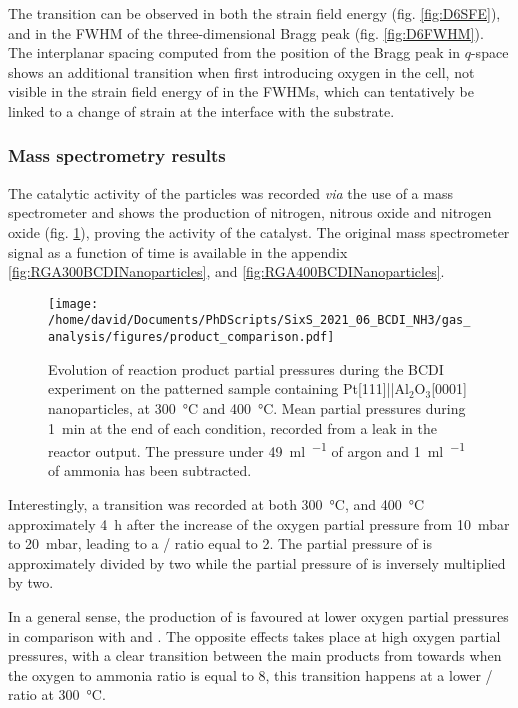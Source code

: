 The transition can be observed in both the strain field energy (fig. \ref{fig:D6SFE}), and in the FWHM of the three-dimensional Bragg peak (fig. \ref{fig:D6FWHM}).
The interplanar spacing computed from the position of the Bragg peak in $q$-space shows an additional transition when first introducing oxygen in the cell, not visible in the strain field energy of in the FWHMs, which can tentatively be linked to a change of strain at the interface with the substrate.

\subsubsection{Mass spectrometry results}

The catalytic activity of the particles was recorded \textit{via} the use of a mass spectrometer and shows the production of nitrogen, nitrous oxide and nitrogen oxide (fig. \ref{fig:RGANanoparticlesBCDIComparison}), proving the activity of the catalyst.
The original mass spectrometer signal as a function of time is available in the appendix \ref{fig:RGA300BCDINanoparticles}, and \ref{fig:RGA400BCDINanoparticles}.

\begin{figure}[!htb]
    \centering
    \texttt{[image: /home/david/Documents/PhDScripts/SixS\_2021\_06\_BCDI\_NH3/gas\_analysis/figures/product\_comparison.pdf]}
    \caption{
        Evolution of reaction product partial pressures during the BCDI experiment on the patterned sample containing Pt[111]||Al$_2$O$_3$[0001] nanoparticles, at \qty{300}{\degreeCelsius} and \qty{400}{\degreeCelsius}.
        Mean partial pressures during \qty{1}{\minute} at the end of each condition, recorded from a leak in the reactor output.
        The pressure under \qty{49}{\ml\per\min} of argon and \qty{1}{\ml\per\min} of ammonia has been subtracted.
    }
    \label{fig:RGANanoparticlesBCDIComparison}
\end{figure}

Interestingly, a transition was recorded at both \qty{300}{\degreeCelsius}, and \qty{400}{\degreeCelsius} approximately \qty{4}{\hour} after the increase of the oxygen partial pressure from \qty{10}{\milli\bar} to \qty{20}{\milli\bar}, leading to a / ratio equal to 2.
The partial pressure of  is approximately divided by two while the partial pressure of  is inversely multiplied by two.

In a general sense, the production of  is favoured at lower oxygen partial pressures in comparison with  and .
The opposite effects takes place at high oxygen partial pressures, with a clear transition between the main products from  towards  when the oxygen to ammonia ratio is equal to 8, this transition happens at a lower / ratio at \qty{300}{\degreeCelsius}.
